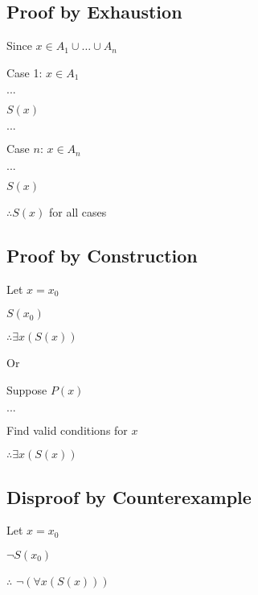 \documentclass[12pt, a4paper]{article}
\begin{document}
\begin{multicols*}{3}
\subsection{Proof by Exhaustion}
\begin{enumproof}[parsep=0em]
  \item Since $x \in A_1 \cup \ldots \cup A_n$
  \item Case 1: $x \in A_1$ 
    \begin{enumproof}[parsep=0em]
      \item $...$
      \item $S(x)$
    \end{enumproof}
  \item $...$
  \item Case $n$: $x \in A_n$
    \begin{enumproof}[parsep=0em]
      \item $...$
      \item $S(x)$
    \end{enumproof}
  \item $\therefore S(x)$ for all cases
\end{enumproof}

\subsection{Proof by Construction}
\begin{enumproof}[parsep=0em]
  \item Let $x=x_0$
    \begin{enumproof}[parsep=0em]
  \item $S(x_0)$
  \end{enumproof}
  \item $\therefore \exists x(S(x))$
\end{enumproof}
\vspace{-1em}
Or
\vspace{-1em}
\begin{enumproof}[parsep=0em]
  \item Suppose $P(x)$
  \begin{enumproof}[parsep=0em]
  \item $...$
  \item Find valid conditions for $x$
  \end{enumproof}
  \item $\therefore \exists x(S(x))$
\end{enumproof}

\subsection{Disproof by Counterexample}
\begin{enumproof}[parsep=0em]
  \item Let $x=x_0$
    \begin{enumproof}[parsep=0em]
  \item $\neg S(x_0)$
  \end{enumproof}
  \item $\therefore$ $\neg(\forall x(S(x)))$
\end{enumproof}

\end{multicols*}
\end{document}
